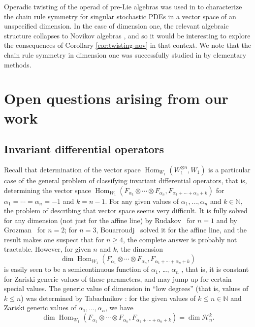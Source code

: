 \documentclass[11pt,reqno]{amsart}
\theoremstyle{plain}
\theoremstyle{definition}
\theoremstyle{remark}
\DeclareMathOperator{\Hom}{Hom}
\begin{document}
Operadic twisting of the operad of pre-Lie algebras was used in \cite{BD24} to characterize the chain rule symmetry for singular stochastic PDEs in a vector space of an unspecified dimension. In the case of dimension one, the relevant algebraic structure collapses to Novikov algebras \cite{BD23}, and so it would be interesting to explore the consequences of Corollary \ref{cor:twisting-nov} in that context. We note that the chain rule symmetry in dimension one was successfully studied in \cite{MR5077058} by elementary methods.    


\section{Open questions arising from our work}

\subsection{Invariant differential operators}

Recall that determination of the vector space 
$\Hom_{W_1}(W_1^{\otimes n}, W_1)$ 
is a particular case of the general problem of classifying invariant differential operators, that is, determining the vector space  
$\Hom_{W_1}(F_{\alpha_1}\otimes\cdots\otimes F_{\alpha_n},F_{\alpha_1+\cdots+\alpha_n+k})$ 
for $\alpha_1=\cdots=\alpha_n=-1$ and $k=n-1$. For any given values of $\alpha_1, \ldots, \alpha_n$ and $k\in\mathbb{N}$, the problem of describing that vector space seems very difficult. It is fully solved for any dimension (not just for the affine line) by Rudakov~\cite{MR0360732} for $n=1$ and by Grozman~\cite{MR575212} for $n=2$; for $n=3$, Bouarroudj~\cite{MR2547399} solved it for the affine line, and the result makes one suspect that for $n\ge 4$, the complete answer is probably not tractable. However, for given $n$ and $k$, the dimension 
 \[
\dim\Hom_{W_1}(F_{\alpha_1}\otimes\cdots\otimes F_{\alpha_n},F_{\alpha_1+\cdots+\alpha_n+k})     
 \]
is easily seen to be a semicontinuous function of $\alpha_1$, \ldots, $\alpha_n$ \cite[Sec.~III.12]{MR0463157}, that is, it is constant for Zariski generic values of these parameters, and may jump up for certain special values. The generic value of dimension in ``low degrees'' (that is, values of $k\le n$) was determined by Tabachnikov \cite[Th.~1.3]{MR742213}: for the given values of $k\le n\in\mathbb{N}$ and Zariski generic values of $\alpha_1,\ldots,\alpha_n$, we have
 \[
\dim \Hom_{W_1}(F_{\alpha_1}\otimes\cdots\otimes F_{\alpha_n},F_{\alpha_1+\cdots+\alpha_n+k})=\dim\mathcal{H}_n^k .
 \]
\end{document}
